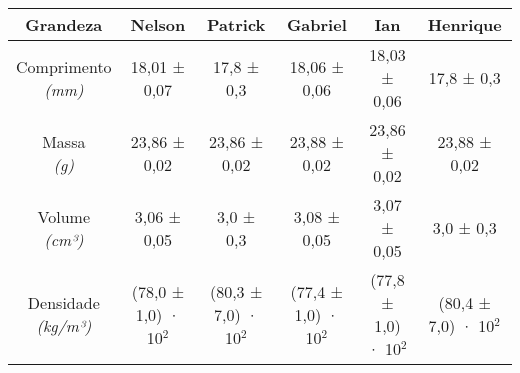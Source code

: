 \documentclass{article}
\begin{document}
\begin{table}[h!]
\centering
\begin{tabular}{c c c c c c }
\toprule
Grandeza & Nelson & Patrick & Gabriel & Ian & Henrique\\
\midrule
\shortstack{Comprimento\\\textit{(mm)}} & 18,01 ± 0,07 & 17,8 ± 0,3 & 18,06 ± 0,06 & 18,03 ± 0,06 & 17,8 ± 0,3\\[4pt]
\shortstack{Massa\\\textit{(g)}} & 23,86 ± 0,02 & 23,86 ± 0,02 & 23,88 ± 0,02 & 23,86 ± 0,02 & 23,88 ± 0,02\\[4pt]
\shortstack{Volume\\\textit{(cm³)}} & 3,06 ± 0,05 & 3,0 ± 0,3 & 3,08 ± 0,05 & 3,07 ± 0,05 & 3,0 ± 0,3\\[4pt]
\shortstack{Densidade\\\textit{(kg/m³)}} & (78,0 ± 1,0) · 10$^{2}$ & (80,3 ± 7,0) · 10$^{2}$ & (77,4 ± 1,0) · 10$^{2}$ & (77,8 ± 1,0) · 10$^{2}$ & (80,4 ± 7,0) · 10$^{2}$\\[4pt]
\bottomrule
\end{tabular}
\end{table}
\end{document}
